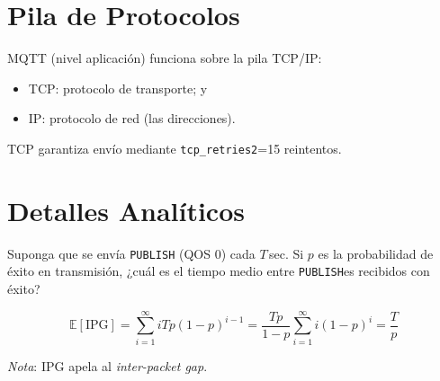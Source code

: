 \documentclass[xcolor={x11names}]{beamer}
\begin{document}
\section{Pila de Protocolos}
\begin{frame}{\secname}
    MQTT (nivel aplicación) funciona sobre la pila TCP/IP:
    \begin{itemize}
        \item TCP: protocolo de transporte; y
        \item IP: protocolo de red (las direcciones).
    \end{itemize}
    \begin{figure}
        
    \end{figure}

    TCP garantiza envío mediante
    \texttt{tcp\_retries2}=15 reintentos.
\end{frame}




\section{Detalles Analíticos}
\begin{frame}{\secname}
    Suponga que se envía \texttt{PUBLISH}
    (QOS 0)
    cada $T$\,\textrm{sec}.
    Si $p$ es la probabilidad de éxito
    en transmisión, ¿cuál es el tiempo
    medio entre \texttt{PUBLISH}es
    recibidos con éxito?

    \begin{equation}
        \mathbb{E}[\text{IPG}] =
        \sum_{i=1}^\infty i T p(1-p)^{i-1}
        = \frac{Tp}{1-p}\sum_{i=1}^\infty i(1-p)^i
        = \frac{T}{p}
    \end{equation}

    \emph{Nota}: IPG apela al \textit{inter-packet gap}.
\end{frame}
\end{document}
